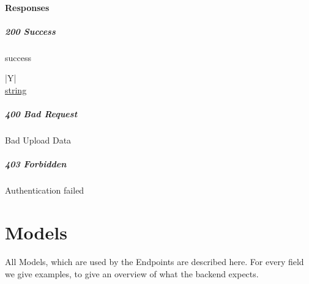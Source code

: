 \documentclass[a4paper
]{ubarticle}
\begin{document}
\subsection{Responses}
\subsubsection{ 200 Success }
success
 

    
        \begin{ubresponses}{\textwidth}{|Y|}
        \\
        \hline
             \hyperref[sec:string] { string } \\
 \hline

        \end{ubresponses}
    
\subsubsection{ 400 Bad Request }
Bad Upload Data
 


\subsubsection{ 403 Forbidden }
Authentication failed
 



\part{Models}
All Models, which are used by the Endpoints are described here. For every field we give examples, to give an overview of what the backend expects.
\label{sec:Models}
\end{document}
